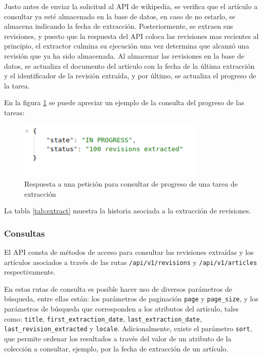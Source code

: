 Justo antes de enviar la solicitud al API de wikipedia, se verifica que el artículo a consultar ya esté almacenado en la base de datos, en caso de no estarlo, se almacena indicando la fecha de extracción.
Posteriormente, se extraen sus revisiones, y puesto que la respuesta del API coloca las revisiones mas recientes al principio, el extractor culmina su ejecución una vez determina que alcanzó una revisión que ya ha sido almacenada.
Al almacenar las revisiones en la base de datos, se actualiza el documento del artículo con la fecha de la última extracción y el identificador de la revisión extraída, y por último, se actualiza el progreso de la tarea.

En la figura \ref{fig:response_status} se puede apreciar un ejemplo de la consulta del progreso de las tareas:

\begin{figure}[H]
	\centering
		\includegraphics[width=0.8\textwidth]{figures/response_status}
	\caption{Respuesta a una petición para consultar de progreso de una tarea de extracción}
	\label{fig:response_status}
\end{figure}

La tabla \ref{tab:extract} muestra la historia asociada a la extracción de revisiones.



\subsubsection{Consultas}

El API consta de métodos de acceso para consultar las revisiones extraídas y
los artículos asociados a través de las rutas \texttt{/api/v1/revisions} y \texttt{/api/v1/articles} respectivamente.

En estas rutas de consulta es posible hacer uso de diversos parámetros de búsqueda,
entre ellas están: los parámetros de paginación \texttt{page} y \texttt{page\_size},
y los parámetros de búsqueda que corresponden a los atributos del artículo,
tales como: \texttt{title}, \texttt{first\_extraction\_date}, \texttt{last\_extraction\_date}, \texttt{last\_revision\_extracted} y \texttt{locale}.
Adicionalmente, existe el parámetro \texttt{sort}, que permite ordenar los resultados a través del valor de un atributo de la colección a consultar, ejemplo, por la fecha de extracción de un artículo.

